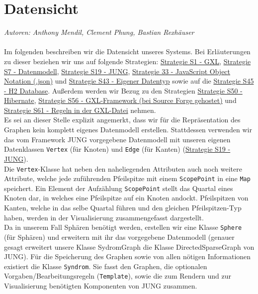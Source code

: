 \documentclass[enabledeprecatedfontcommands,fontsize=11pt,paper=a4,twoside]{scrartcl}
\newcounter{one}
\begin{document}
	
	\newpage
	\section{Datensicht}
	\label{sec:datensicht}
	
	\emph{Autoren: Anthony Mendil, Clement Phung, Bastian Rexhäuser}\\ \\
	
	Im folgenden beschreiben wir die Datensicht unseres Systems. Bei Erläuterungen zu dieser beziehen wir uns auf folgende Strategien: \hyperlink{yy}{Strategie S1 - GXL}, \hyperlink{aaa}{Strategie S7 - Datenmodell}, \hyperlink{eee}{Strategie S19 - JUNG}, \hyperlink{jjj}{Strategie 33 - JavaScript Object Notation (.json)} und \hyperlink{ooo}{Strategie S43 - Eigener Datentyp} sowie auf die \hyperlink{ppp}{Strategie S45 - H2 Database}. Außerdem werden wir Bezug zu den Strategien \hyperlink{rrr}{Strategie S50 - Hibernate}, \hyperlink{ttt}{Strategie S56 - GXL-Framework (bei Source Forge gehostet)} und \hyperlink{vvv}{Strategie S61 - Regeln in der GXL-Datei} nehmen.\\
	
	Es sei an dieser Stelle explizit angemerkt, dass wir für die Repräsentation des Graphen kein komplett eigenes Datenmodell erstellen. Stattdessen verwenden wir das vom Framework JUNG vorgegebene Datenmodell mit unseren eigenen Datenklassen \texttt{Vertex} (für Knoten) und \texttt{Edge} (für Kanten) (\hyperlink{eee}{Strategie S19 - JUNG}). \\
	Die \texttt{Vertex}-Klasse hat neben den naheliegenden Attributen auch noch weitere Attribute, welche jede zuführenden Pfeilspitze mit einem \texttt{ScopePoint} in eine \texttt{Map} speichert. Ein Element der Aufzählung \texttt{ScopePoint} stellt das Quartal eines Knoten dar, in welches eine Pfeilspitze auf ein Knoten andockt. Pfeilspitzen von Kanten, welche in das selbe Quartal führen und den gleichen Pfeilspitzen-Typ haben, werden in der Visualisierung zusammengefasst dargestellt. \\
	
	Da in unserem Fall Sphären benötigt werden, erstellen wir eine Klasse \texttt{Sphere} (für Sphären) und erweitern mit ihr das vorgegebene Datenmodell (genauer gesagt erweitert unsere Klasse SydromGraph die Klasse DirectedSparseGraph von JUNG). 
	Für die Speicherung des Graphen sowie von allen nötigen Informationen existiert die Klasse \texttt{Syndrom}. Sie fasst den Graphen, die optionalen Vorgaben/Bearbeitungsregeln (\texttt{Template}), sowie die zum Rendern und zur Visualisierung benötigten Komponenten von JUNG zusammen. \\
	
\end{document}
